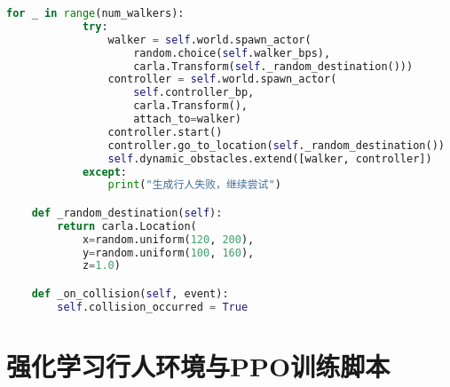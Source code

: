 \begin{lstlisting}[language=Python]
        for _ in range(num_walkers):
            try:
                walker = self.world.spawn_actor(
                    random.choice(self.walker_bps),
                    carla.Transform(self._random_destination()))
                controller = self.world.spawn_actor(
                    self.controller_bp,
                    carla.Transform(),
                    attach_to=walker)
                controller.start()
                controller.go_to_location(self._random_destination())
                self.dynamic_obstacles.extend([walker, controller])
            except:
                print("生成行人失败，继续尝试")

    def _random_destination(self):
        return carla.Location(
            x=random.uniform(120, 200),
            y=random.uniform(100, 160),
            z=1.0)

    def _on_collision(self, event):
        self.collision_occurred = True

\end{lstlisting}

\section{强化学习行人环境与PPO训练脚本}

